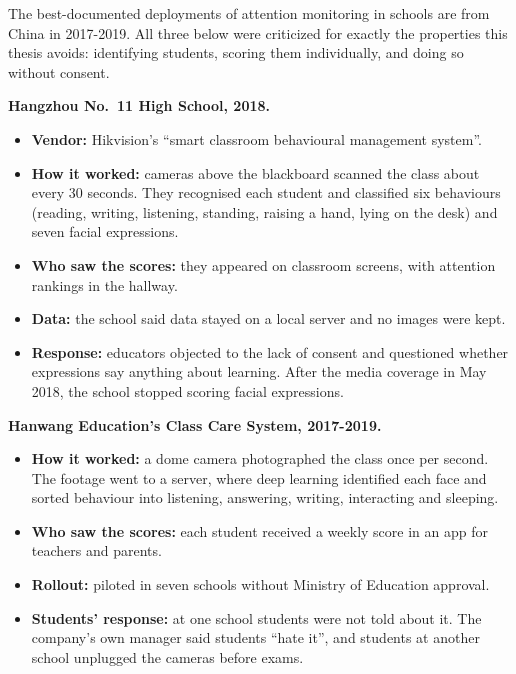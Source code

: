 The best-documented deployments of attention monitoring in schools are from China in 2017-2019. All three below were criticized for exactly the properties this thesis avoids: identifying students, scoring them individually, and doing so without consent.

\textbf{Hangzhou No.~11 High School, 2018. \cite{b7,b8,b9,b10}}

\begin{itemize}
\tightlist
\item
  \textbf{Vendor:} Hikvision's ``smart classroom behavioural management system''.
\item
  \textbf{How it worked:} cameras above the blackboard scanned the class about every 30 seconds. They recognised each student and classified six behaviours (reading, writing, listening, standing, raising a hand, lying on the desk) and seven facial expressions.
\item
  \textbf{Who saw the scores:} they appeared on classroom screens, with attention rankings in the hallway.
\item
  \textbf{Data:} the school said data stayed on a local server and no images were kept.
\item
  \textbf{Response:} educators objected to the lack of consent and questioned whether expressions say anything about learning. After the media coverage in May 2018, the school stopped scoring facial expressions.
\end{itemize}

\textbf{Hanwang Education's Class Care System, 2017-2019. \cite{b10}}

\begin{itemize}
\tightlist
\item
  \textbf{How it worked:} a dome camera photographed the class once per second. The footage went to a server, where deep learning identified each face and sorted behaviour into listening, answering, writing, interacting and sleeping.
\item
  \textbf{Who saw the scores:} each student received a weekly score in an app for teachers and parents.
\item
  \textbf{Rollout:} piloted in seven schools without Ministry of Education approval.
\item
  \textbf{Students' response:} at one school students were not told about it. The company's own manager said students ``hate it'', and students at another school unplugged the cameras before exams.
\end{itemize}

